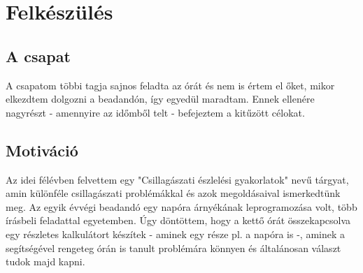 \chapter{Felkészülés}

\label{ch:felkeszules}

\section{A csapat}

A csapatom többi tagja sajnos feladta az órát és nem is értem el őket, mikor elkezdtem dolgozni a beadandón, így egyedül maradtam. Ennek ellenére nagyrészt - amennyire az időmből telt - befejeztem a kitűzött célokat.

\section{Motiváció}

Az idei félévben felvettem egy "Csillagászati észlelési gyakorlatok" nevű tárgyat, amin különféle csillagászati problémákkal és azok megoldásaival ismerkedtünk meg. Az egyik évvégi beadandó egy napóra árnyékának leprogramozása volt, több írásbeli feladattal egyetemben. Úgy döntöttem, hogy a kettő órát összekapcsolva egy részletes kalkulátort készítek - aminek egy része pl. a napóra is -, aminek a segítségével rengeteg órán is tanult problémára könnyen és általánosan választ tudok majd kapni.